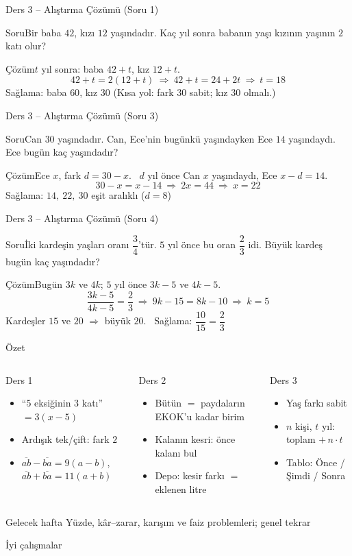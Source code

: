 \documentclass[aspectratio=169,11pt,handout]{beamer}
\newcommand{\soru}[3]{%
\begin{frame}{#1}
  \begin{block}{Soru}\large #2\end{block}
  \pause
  \begin{exampleblock}{Çözüm}\large #3\end{exampleblock}
\end{frame}}
\newcommand{\ab}[1]{\overline{#1}}
\begin{document}
\soru{Ders 3 -- Alıştırma Çözümü (Soru 1)}
{Bir baba \(42\), kızı \(12\) yaşındadır. Kaç yıl sonra babanın yaşı kızının yaşının \(2\) katı olur?}
{\(t\) yıl sonra: baba \(42+t\), kız \(12+t\).
\[42+t=2(12+t)\ \Rightarrow\ 42+t=24+2t\ \Rightarrow\ t=18\]
Sağlama: baba \(60\), kız \(30\) \checkmark \quad (Kısa yol: fark \(30\) sabit; kız \(30\) olmalı.)}

\soru{Ders 3 -- Alıştırma Çözümü (Soru 3)}
{Can \(30\) yaşındadır. Can, Ece'nin bugünkü yaşındayken Ece \(14\) yaşındaydı. Ece bugün kaç yaşındadır?}
{Ece \(x\), fark \(d=30-x\). \ \(d\) yıl önce Can \(x\) yaşındaydı, Ece \(x-d=14\).
\[30-x=x-14\ \Rightarrow\ 2x=44\ \Rightarrow\ x=22\]
Sağlama: \(14,\ 22,\ 30\) eşit aralıklı (\(d=8\)) \checkmark}

\soru{Ders 3 -- Alıştırma Çözümü (Soru 4)}
{İki kardeşin yaşları oranı \(\dfrac{3}{4}\)'tür. \(5\) yıl önce bu oran \(\dfrac{2}{3}\) idi. Büyük kardeş bugün kaç yaşındadır?}
{Bugün \(3k\) ve \(4k\); \(5\) yıl önce \(3k-5\) ve \(4k-5\).
\[\frac{3k-5}{4k-5}=\frac{2}{3}\ \Rightarrow\ 9k-15=8k-10\ \Rightarrow\ k=5\]
Kardeşler \(15\) ve \(20\) \(\Rightarrow\) büyük \(20\). \ Sağlama: \(\dfrac{10}{15}=\dfrac{2}{3}\) \checkmark}


\begin{frame}{Özet}
\begin{columns}[t]
\begin{block}{Ders 1}
\begin{itemize}
\item ``\(5\) eksiğinin \(3\) katı'' \(=3(x-5)\)
\item Ardışık tek/çift: fark \(2\)
\item \(\ab{ab}-\ab{ba}=9(a-b)\), \ \(\ab{ab}+\ab{ba}=11(a+b)\)
\end{itemize}
\end{block}
\begin{block}{Ders 2}
\begin{itemize}
\item Bütün \(=\) paydaların EKOK'u kadar birim
\item Kalanın kesri: önce kalanı bul
\item Depo: kesir farkı \(=\) eklenen litre
\end{itemize}
\end{block}
\begin{block}{Ders 3}
\begin{itemize}
\item Yaş farkı sabit
\item \(n\) kişi, \(t\) yıl: toplam \(+\,n\cdot t\)
\item Tablo: Önce / Şimdi / Sonra
\end{itemize}
\end{block}
\end{columns}
\vspace{6pt}
\begin{alertblock}{Gelecek hafta}
Yüzde, kâr--zarar, karışım ve faiz problemleri; genel tekrar
\end{alertblock}
\end{frame}

\begin{frame}
\centering\Large İyi çalışmalar
\end{frame}
\end{document}
